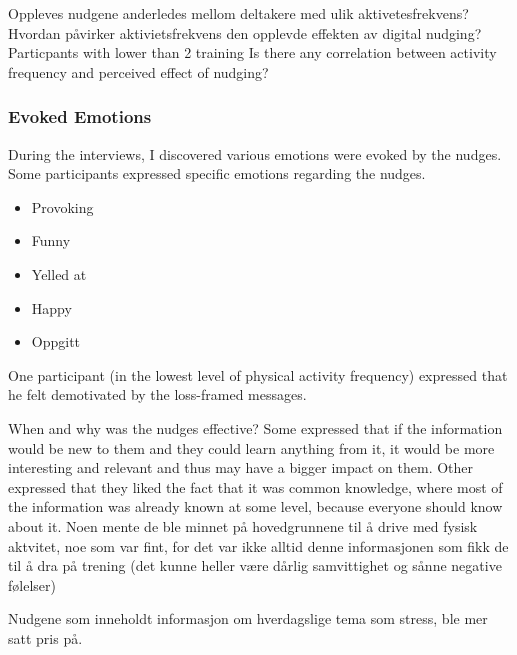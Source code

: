Oppleves nudgene anderledes mellom deltakere med ulik aktivetesfrekvens? 
Hvordan påvirker aktivietsfrekvens den opplevde effekten av digital nudging?
Particpants with lower than 2 training 
Is there any correlation between activity frequency and perceived effect of nudging?

\subsubsection{Evoked Emotions}
During the interviews, I discovered various emotions were evoked by the nudges. Some participants expressed specific emotions regarding the nudges. 
\begin{itemize}
\item Provoking
\item Funny
\item Yelled at
\item Happy
\item Oppgitt
\end{itemize}

One participant (in the lowest level of physical activity frequency) expressed that he felt demotivated by the loss-framed messages. 

When and why was the nudges effective?
Some expressed that if the information would be new to them and they could learn anything from it, it would be more interesting and relevant and thus may have a bigger impact on them.
Other expressed that they liked the fact that it was common knowledge, where most of the information was already known at some level, because everyone should know about it. 
Noen mente de ble minnet på hovedgrunnene til å drive med fysisk aktvitet, noe som var fint, for det var ikke alltid denne informasjonen som fikk de til å dra på trening (det kunne heller være dårlig samvittighet og sånne negative følelser)

Nudgene som inneholdt informasjon om hverdagslige tema som stress, ble mer satt pris på. 

\begin{comment}
\begin{table}[ht]
\begin{center}
\begin{tabular}{|c|c|c|}
\hline
\textbf{Gain} & \textbf{Loss} & \textbf{Indifferent} \\ \hline
15 & 3 & 4 \\ \hline
\end{tabular}
\caption{\label{tab:table-name} Shows how many participants preferred the different wording of the message.}
\end{center}
\end{table}
\end{comment}

